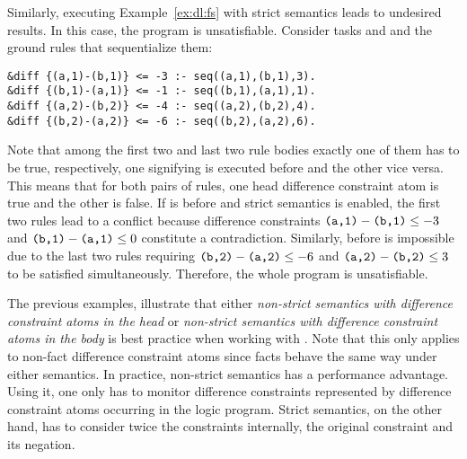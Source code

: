 \begin{example}
Similarly, executing Example~\ref{ex:dl:fs} with strict semantics leads to undesired results.
In this case, the program is unsatisfiable.
Consider tasks  and  and the ground rules that sequentialize them:
\begin{lstlisting}[numbers=none]
&diff {(a,1)-(b,1)} <= -3 :- seq((a,1),(b,1),3).
&diff {(b,1)-(a,1)} <= -1 :- seq((b,1),(a,1),1).
&diff {(a,2)-(b,2)} <= -4 :- seq((a,2),(b,2),4).
&diff {(b,2)-(a,2)} <= -6 :- seq((b,2),(a,2),6).
\end{lstlisting}
Note that among the first two and last two rule bodies exactly one of them has to be true, respectively,
one signifying  is executed before  and the other vice versa.
This means that for both pairs of rules, one head difference constraint atom is true and the other is false.
If  is before  and strict semantics is enabled, 
the first two rules lead to a conflict because difference constraints $\texttt{(a,1)}-\texttt{(b,1)}\leq -3$ and $\texttt{(b,1)}-\texttt{(a,1)}\leq 0$ constitute a contradiction.
Similarly,  before  is impossible due to the last two rules
requiring $\texttt{(b,2)}-\texttt{(a,2)}\leq -6$ and $\texttt{(a,2)}-\texttt{(b,2)}\leq 3$ to be satisfied simultaneously.
Therefore, the whole program is unsatisfiable.
\end{example}

The previous examples, illustrate that either \emph{non-strict semantics with difference constraint atoms in the head} or
\emph{non-strict semantics with difference constraint atoms in the body} is best practice when working with .
Note that this only applies to non-fact difference constraint atoms since facts behave the same way under either semantics.
In practice, non-strict semantics has a performance advantage.
Using it, one only has to monitor difference constraints represented by difference constraint atoms occurring in the logic program.
Strict semantics, on the other hand, has to consider twice the constraints internally, the original constraint and its negation.

